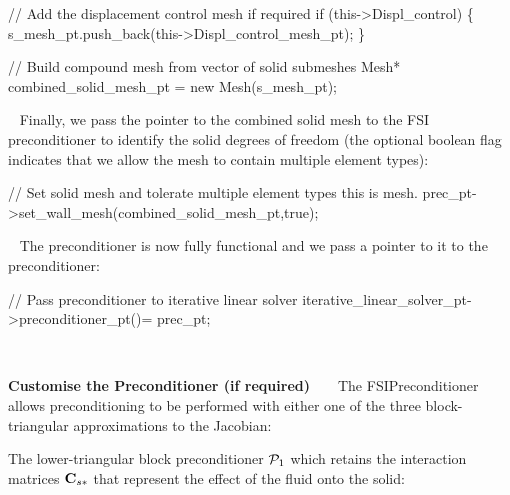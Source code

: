 \begin{DoxyEnumerate}
\begin{DoxyCodeInclude}
      \textcolor{comment}{// Add the displacement control mesh if required}
      \textcolor{keywordflow}{if} (this->Displ\_control) 
       \{
        s\_mesh\_pt.push\_back(this->Displ\_control\_mesh\_pt);
       \}

      \textcolor{comment}{// Build compound mesh from vector of solid submeshes}
      Mesh* combined\_solid\_mesh\_pt = \textcolor{keyword}{new} Mesh(s\_mesh\_pt);

\end{DoxyCodeInclude}
 ~\newline
 Finally, we pass the pointer to the combined solid mesh to the F\+SI preconditioner to identify the solid degrees of freedom (the optional boolean flag indicates that we allow the mesh to contain multiple element types)\+: ~\newline
~\newline
 
\begin{DoxyCodeInclude}

      \textcolor{comment}{// Set solid mesh and tolerate multiple element types this is mesh.}
      prec\_pt->set\_wall\_mesh(combined\_solid\_mesh\_pt,\textcolor{keyword}{true});

\end{DoxyCodeInclude}
 ~\newline
 The preconditioner is now fully functional and we pass a pointer to it to the preconditioner\+: ~\newline
~\newline
 
\begin{DoxyCodeInclude}
      \textcolor{comment}{// Pass preconditioner to iterative linear solver}
      iterative\_linear\_solver\_pt->preconditioner\_pt()= prec\_pt;

\end{DoxyCodeInclude}
 ~\newline

\item {\bfseries Customise the Preconditioner (if required)} ~\newline
~\newline
 The {\ttfamily F\+S\+I\+Preconditioner} allows preconditioning to be performed with either one of the three block-\/triangular approximations to the Jacobian\+: ~\newline
~\newline

\begin{DoxyEnumerate}
\item The lower-\/triangular block preconditioner $ {\cal P}_1 $ which retains the interaction matrices $ {\bf C}_{s*} $ that represent the effect of the fluid onto the solid\+: ~\newline
~\newline
  

\end{DoxyEnumerate}
\end{DoxyEnumerate}
